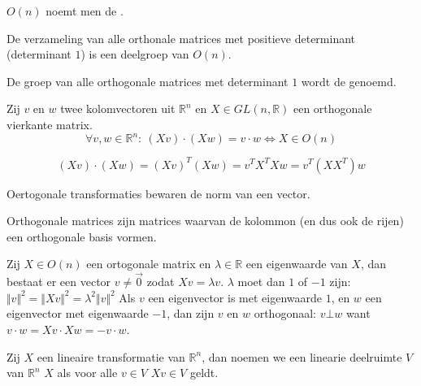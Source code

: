 \documentclass[main.tex]{subfiles}
\begin{document}
\begin{de}
  $O(n)$ noemt men de .
\end{de}

\begin{st}
  De verzameling van alle orthonale matrices met positieve determinant (determinant $1$) is een deelgroep van $O(n)$.
\end{st}

\begin{de}
  De groep van alle orthogonale matrices met determinant $1$ wordt de  genoemd.
\end{de}

\begin{st}
  Zij $v$ en $w$ twee kolomvectoren uit $\mathbb{R}^{n}$ en $X \in GL(n,\mathbb{R})$ een orthogonale vierkante matrix.
  \[ \forall v,w \in \mathbb{R}^{n}:\ (Xv)\cdot(Xw) = v \cdot w \Leftrightarrow X \in O(n) \]

\[ (Xv) \cdot (Xw) = (Xv)^{T}(Xw) = v^{T}X^{T}Xw = v^{T}(XX^{T})w \]
\end{st}

\begin{st}
  Oertogonale transformaties bewaren de norm van een vector.
\end{st}

\begin{de}
  Orthogonale matrices zijn matrices waarvan de kolommon (en dus ook de rijen) een orthogonale basis vormen.
\end{de}

\begin{st}
  Zij $X\in O(n)$ een ortogonale matrix en $\lambda\in \mathbb{R}$ een eigenwaarde van $X$, dan bestaat er een vector $v\neq \vec{0}$ zodat $Xv = \lambda v$.
  $\lambda$ moet dan $1$ of $-1$ zijn: $ \Vert v \Vert^{2} = \Vert X v \Vert^{2} = \lambda^{2}\Vert v\Vert^{2}$
  Als $v$ een eigenvector is met eigenwaarde $1$, en $w$ een eigenvector met eigenwaarde $-1$, dan zijn $v$ en $w$ orthogonaal: $v \bot w$
  want $v \cdot w = Xv \cdot Xw = -v \cdot w$.
\end{st}

\begin{de}
  Zij $X$ een lineaire transformatie van $\mathbb{R}^{n}$, dan noemen we een linearie deelruimte $V$ van $\mathbb{R}^{n}$  $X$ als voor alle $v\in V$ $Xv \in V$ geldt.
\end{de}
\end{document}
